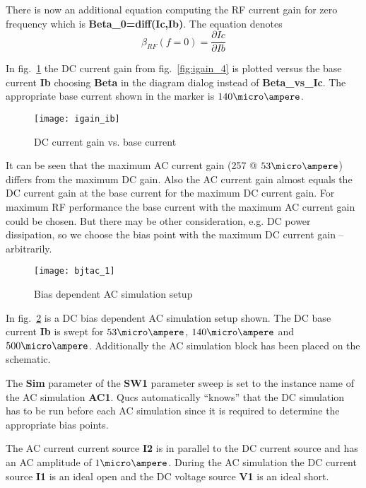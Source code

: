 There is now an additional equation computing the RF current gain for
zero frequency which is \textbf{Beta\_0=diff(Ic,Ib)}.  The equation
denotes
\begin{equation*}
\beta_{RF}\left(f=0\right) = \dfrac{\partial Ic}{\partial Ib}
\end{equation*}

In fig.~\ref{fig:igain_ib} the DC current gain from
fig.~\ref{fig:igain_4} is plotted versus the base current \textbf{Ib}
choosing \textbf{Beta} in the diagram dialog instead of
\textbf{Beta\_vs\_Ic}.  The appropriate base current shown in the
marker is $140\micro\ampere$.

\begin{figure}[ht]
  \centering
  \texttt{[image: igain\_ib]}
  \caption{DC current gain vs. base current}
  \label{fig:igain_ib}
\end{figure}
\FloatBarrier

It can be seen that the maximum AC current gain (257 @
$53\micro\ampere$) differs from the maximum DC gain.  Also the AC
current gain almost equals the DC current gain at the base current
for the maximum DC current gain.  For maximum RF performance the base
current with the maximum AC current gain could be chosen.  But there
may be other consideration, e.g. DC power dissipation, so we choose
the bias point with the maximum DC current gain -- arbitrarily.

\begin{figure}[ht]
  \centering
  \texttt{[image: bjtac\_1]}
  \caption{Bias dependent AC simulation setup}
  \label{fig:bjtac_1}
\end{figure}
\FloatBarrier

In fig.~\ref{fig:bjtac_1} is a DC bias dependent AC simulation setup
shown.  The DC base current \textbf{Ib} is swept for
$53\micro\ampere$, $140\micro\ampere$ and $500\micro\ampere$.
Additionally the AC simulation block has been placed on the schematic.

\medskip

The \textbf{Sim} parameter of the \textbf{SW1} parameter sweep is set
to the instance name of the AC simulation \textbf{AC1}.  Qucs
automatically ``knows'' that the DC simulation has to be run before
each AC simulation since it is required to determine the appropriate
bias points.

\medskip

The AC current current source \textbf{I2} is in parallel to the DC
current source and has an AC amplitude of $1\micro\ampere$.  During
the AC simulation the DC current source \textbf{I1} is an ideal open
and the DC voltage source \textbf{V1} is an ideal short.

